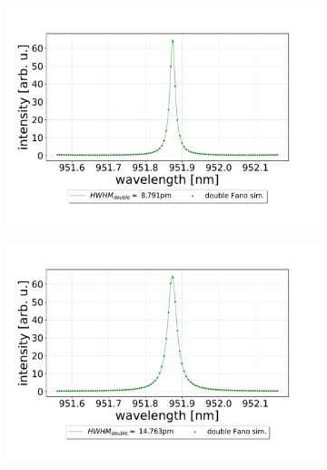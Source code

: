 \begin{figure}[h!]
    \centering
    \begin{subfigure}[b]{0.49\textwidth}
        \includegraphics[width=\textwidth]{figures/results/double fano fits/1000um_M3:M5_simfit.pdf}
        \caption{}
        \label{fig:1000um_M3:M5_sim}
    \end{subfigure}
    \begin{subfigure}[b]{0.49\textwidth}
        \includegraphics[width=\textwidth]{figures/results/double fano fits/550um_M3:M5_simfit.pdf}
        \caption{}
        \label{fig:550um_M3:M5_sim}
    \end{subfigure}
    \begin{subfigure}[b]{0.49\textwidth}

\end{subfigure}
\end{figure}
